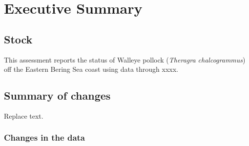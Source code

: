 \documentclass[11pt,
  english,
  a4paper,
]{article}
\begin{document}

\hypertarget{executive-summary}{%
\section*{Executive Summary}\label{executive-summary}}

\leavevmode\tagmcend\tagstructend


\hypertarget{stock}{%
\subsection*{Stock}\label{stock}}

\leavevmode\tagmcend\tagstructend


This assessment reports the status of Walleye pollock (\emph{Theragra chalcogrammus}) off the Eastern Bering Sea coast using data through xxxx.

\leavevmode\tagmcend\tagstructend\par


\hypertarget{summary-of-changes}{%
\subsection*{Summary of changes}\label{summary-of-changes}}

\leavevmode\tagmcend\tagstructend


Replace text.

\leavevmode\tagmcend\tagstructend\par


\hypertarget{changes-in-the-data}{%
\subsubsection*{Changes in the data}\label{changes-in-the-data}}

\leavevmode\tagmcend\tagstructend
\end{document}
